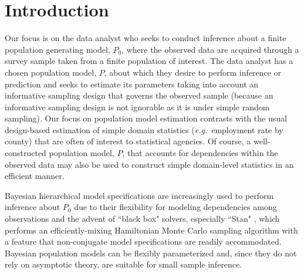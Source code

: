 \documentclass[]{imsart}
\newcommand{\eg} {\hbox{\textit{e.g.}}}
\begin{document}
\begin{frontmatter}
\begin{keyword}
 
\end{keyword}
\tableofcontents
\end{frontmatter}

\section{Introduction}
Our focus is on the data analyst who seeks to conduct inference about a finite population generating model,
$P_{0}$, where the observed data are acquired through a survey sample taken from a finite population of interest.   The data analyst has a chosen population model, $P$, about which they desire to perform inference or prediction and seeks to estimate its parameters taking into account
an informative sampling design that governs the observed sample (because an informative sampling design is not ignorable as it is under simple random sampling). Our focus on population model estimation contrasts with the usual design-based estimation of simple domain statistics (\eg\ employment rate by county)
that are often of interest to statistical agencies. Of course, a well-constructed population model, $P$,  that accounts for dependencies within the observed data may also be used to construct simple domain-level statistics in an efficient manner.

Bayesian hierarchical model specifications are increasingly used to perform inference about $P_{0}$
due to their flexibility for modeling dependencies among observations and the advent of
``black box" solvers, especially ``Stan" \citep{carpenter2016stan}, which performs an
efficiently-mixing Hamiltonian Monte Carlo sampling algorithm with a feature that
non-conjugate model specifications are readily accommodated.
Bayesian population models can be flexibly parameterized and, since
they do not rely on asymptotic theory, are suitable for small sample inference.
\end{document}

